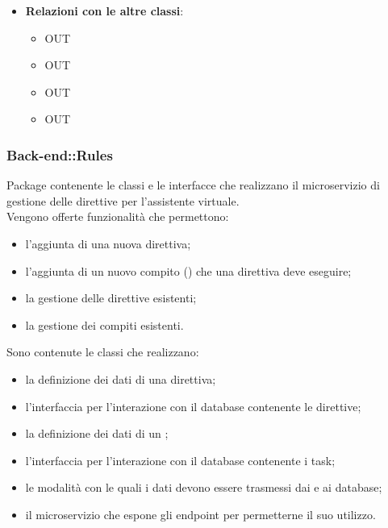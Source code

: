 \begin{itemize}
\begin{itemize}
\begin{itemize}
		\end{itemize}
	\end{itemize}
	\item \textbf{Relazioni con le altre classi}:
	\begin{itemize}
		\item OUT \hyperlink{LambdaContext_label}{}
		\item OUT \hyperlink{LambdaEvent_label}{}
		\item OUT \hyperlink{NotificationChannel_label}{}
		\item OUT \hyperlink{NotificationMessage_label}{}
	\end{itemize}
\end{itemize}
\FloatBarrier

\subsubsection{Back-end::Rules}
Package contenente le classi e le interfacce che realizzano il microservizio di gestione delle direttive per l'assistente virtuale.\\
Vengono offerte funzionalità che permettono:
\begin{itemize}
\item l'aggiunta di una nuova direttiva;
\item l'aggiunta di un nuovo compito () che una direttiva deve eseguire;
\item la gestione delle direttive esistenti;
\item la gestione dei compiti esistenti.
\end{itemize}
Sono contenute le classi che realizzano:
\begin{itemize}
\item la definizione dei dati di una direttiva;
\item l'interfaccia per l'interazione con il database contenente le direttive;
\item la definizione dei dati di un ;
\item l'interfaccia per l'interazione con il database contenente i task;
\item le modalità con le quali i dati devono essere trasmessi dai e ai database;
\item il microservizio che espone gli endpoint per permetterne il suo utilizzo.
\end{itemize}
